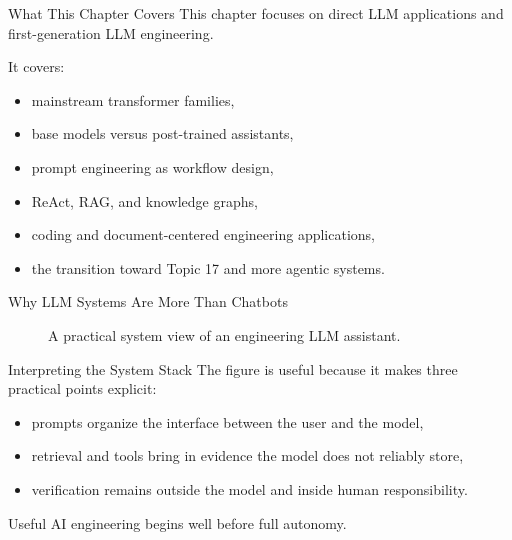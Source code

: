 \documentclass[12pt]{beamer}
\begin{document}
\begin{frame}{What This Chapter Covers}
  This chapter focuses on direct LLM applications and first-generation LLM engineering.

  It covers:
  \begin{itemize}
    \item mainstream transformer families,
    \item base models versus post-trained assistants,
    \item prompt engineering as workflow design,
    \item ReAct, RAG, and knowledge graphs,
    \item coding and document-centered engineering applications,
    \item the transition toward Topic 17 and more agentic systems.
  \end{itemize}
\end{frame}

\begin{frame}{Why LLM Systems Are More Than Chatbots}
  \begin{figure}
    \centering
    \caption{A practical system view of an engineering LLM assistant.}
  \end{figure}
\end{frame}

\begin{frame}{Interpreting the System Stack}
  The figure is useful because it makes three practical points explicit:
  \begin{itemize}
    \item prompts organize the interface between the user and the model,
    \item retrieval and tools bring in evidence the model does not reliably store,
    \item verification remains outside the model and inside human responsibility.
  \end{itemize}

  Useful AI engineering begins well before full autonomy.
\end{frame}
\end{document}

